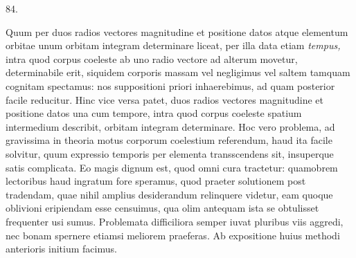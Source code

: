 \par{}\medskip
\hypertarget{native-113-article084}{}
\begin{center}84.\end{center}
Quum per duos radios vectores magnitudine et positione datos atque elementum orbitae unum orbitam integram determinare liceat, per illa data etiam \emph{tempus,} intra quod corpus coeleste ab uno radio vectore ad alterum movetur, determinabile erit, siquidem corporis massam vel negligimus vel saltem tamquam cognitam spectamus: nos suppositioni priori inhaerebimus, ad quam posterior facile reducitur. Hinc vice versa patet, duos radios vectores magnitudine et positione datos una cum tempore, intra quod corpus coeleste spatium intermedium describit, orbitam integram determinare. Hoc vero problema, ad gravissima in theoria motus corporum coelestium referendum, haud ita facile solvitur, quum expressio temporis per elementa transscendens sit, insuperque satis complicata. Eo magis dignum est, quod omni cura tractetur: quamobrem lectoribus haud ingratum fore speramus, quod praeter solutionem post tradendam, quae nihil amplius desiderandum relinquere videtur, eam quoque oblivioni eripiendam esse censuimus, qua olim antequam ista se obtulisset frequenter usi sumus. Problemata difficiliora semper iuvat pluribus viis aggredi, nec bonam spernere etiamsi meliorem praeferas. Ab expositione huius methodi anterioris initium facimus.
